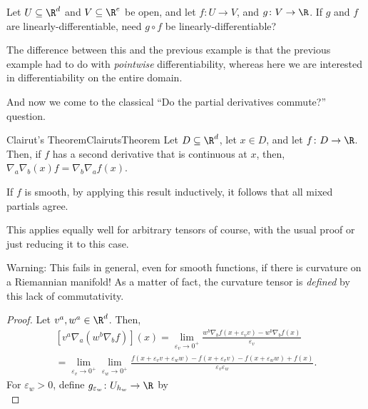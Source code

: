 \begin{exr}{}{}
	Let $U\subseteq \R ^d$ and $V\subseteq \R ^e$ be open, and let $f\colon U\rightarrow V$, and $g\colon V\rightarrow \R$.  If $g$ and $f$ are linearly-differentiable, need $g\circ f$ be linearly-differentiable?
	\begin{rmk}
		The difference between this and the previous example is that the previous example had to do with \emph{pointwise} differentiability, whereas here we are interested in differentiability on the entire domain.
	\end{rmk}
\end{exr}

And now we come to the classical ``Do the partial derivatives commute?'' question.
\begin{thm}{Clairut's Theorem}{ClairutsTheorem}
Let $D\subseteq \R ^d$, let $x\in D$, and let $f\colon D\rightarrow \R$.  Then, if $f$ has a second derivative that is continuous at $x$, then, $\nabla _a\nabla _b(x)f=\nabla _b\nabla _af(x)$.
\begin{rmk}
If $f$ is smooth, by applying this result inductively, it follows that all mixed partials agree.
\end{rmk}
\begin{rmk}
This applies equally well for arbitrary tensors of course, with the usual proof or just reducing it to this case.
\end{rmk}
\begin{wrn}
Warning:  This fails in general, even for smooth functions, if there is curvature on a Riemannian manifold!  As a matter of fact, the curvature tensor is \emph{defined} by this lack of commutativity.
\end{wrn}
\begin{proof}
Let $v^a,w^a\in \R ^d$.  Then,
{\scriptsize
\begin{equation*}
\begin{multlined}
[v^a\nabla _a(w^b\nabla _bf)](x)=\lim _{\varepsilon _v\to 0^+}\frac{w^b\nabla _bf(x+\varepsilon _vv)-w^b\nabla _bf(x)}{\varepsilon _v} \\ =\lim _{\varepsilon _v\to 0^+}\lim _{\varepsilon _w\to 0^+}\frac{f(x+\varepsilon _vv+\varepsilon _ww)-f(x+\varepsilon _vv)-f(x+\varepsilon _ww)+f(x)}{\varepsilon _v\varepsilon _w}.
\end{multlined}
\end{equation*}
}
For $\varepsilon _w>0$, define $g_{\varepsilon _w}\colon U_{h_w}\rightarrow \R$ by
\begin{equation}

\end{equation}
\end{proof}
\end{thm}
